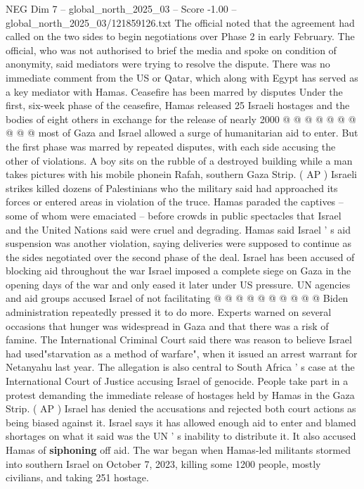 \begin{textsample}{NEG Dim 7 – global\_north\_2025\_03 – Score -1.00 – global\_north\_2025\_03/121859126.txt}
The official noted that the agreement had called on the two sides to begin negotiations over Phase 2 in early February.
The official, who was not authorised to brief the media and spoke on condition of anonymity, said mediators were trying to resolve the dispute.
There was no immediate comment from the US or Qatar, which along with Egypt has served as a key mediator with Hamas.
Ceasefire has been marred by disputes Under the first, six-week phase of the ceasefire, Hamas released 25 Israeli hostages and the bodies of eight others in exchange for the release of nearly 2000 @ @ @ @ @ @ @ @ @ @ most of Gaza and Israel allowed a surge of humanitarian aid to enter.
But the first phase was marred by repeated disputes, with each side accusing the other of violations.
A boy sits on the rubble of a destroyed building while a man takes pictures with his mobile phonein Rafah, southern Gaza Strip. ( AP ) Israeli strikes killed dozens of Palestinians who the military said had approached its forces or entered areas in violation of the truce.
Hamas paraded the captives -- some of whom were emaciated -- before crowds in public spectacles that Israel and the United Nations said were cruel and degrading.
Hamas said Israel ' s aid suspension was another violation, saying deliveries were supposed to continue as the sides negotiated over the second phase of the deal.
Israel has been accused of blocking aid throughout the war Israel imposed a complete siege on Gaza in the opening days of the war and only eased it later under US pressure.
UN agencies and aid groups accused Israel of not facilitating @ @ @ @ @ @ @ @ @ @ Biden administration repeatedly pressed it to do more.
Experts warned on several occasions that hunger was widespread in Gaza and that there was a risk of famine.
The International Criminal Court said there was reason to believe Israel had used"starvation as a method of warfare", when it issued an arrest warrant for Netanyahu last year.
The allegation is also central to South Africa ' s case at the International Court of Justice accusing Israel of genocide.
People take part in a protest demanding the immediate release of hostages held by Hamas in the Gaza Strip. ( AP ) Israel has denied the accusations and rejected both court actions as being biased against it.
Israel says it has allowed enough aid to enter and blamed shortages on what it said was the UN ' s inability to distribute it.
It also accused Hamas of \textbf{siphoning} off aid.
The war began when Hamas-led militants stormed into southern Israel on October 7, 2023, killing some 1200 people, mostly civilians, and taking 251 hostage.

\end{textsample}

